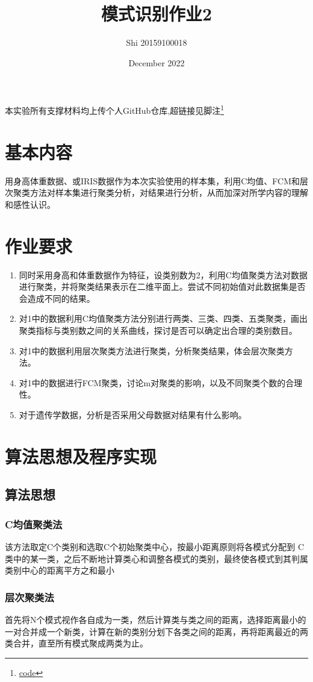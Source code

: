 \documentclass{article}
\title{模式识别作业2}
\author{Shi 20159100018}
\date{December 2022}
\begin{document}
 

\maketitle 
本实验所有支撑材料均上传个人GitHub仓库,超链接见脚注\footnote{\href{https://github.com/Shi5013/HomeWork2022/tree/main/PatternRecognition}{code}}

\section{基本内容}
用身高体重数据、或IRIS数据作为本次实验使用的样本集，利用C均值、FCM和层次聚类方法对样本集进行聚类分析，对结果进行分析，从而加深对所学内容的理解和感性认识。
\section{作业要求}
\begin{enumerate}
    \item 同时采用身高和体重数据作为特征，设类别数为2，利用C均值聚类方法对数据进行聚类，并将聚类结果表示在二维平面上。尝试不同初始值对此数据集是否会造成不同的结果。
    \item 对1中的数据利用C均值聚类方法分别进行两类、三类、四类、五类聚类，画出聚类指标与类别数之间的关系曲线，探讨是否可以确定出合理的类别数目。
    \item 对1中的数据利用层次聚类方法进行聚类，分析聚类结果，体会层次聚类方法。
    \item 对1中的数据进行FCM聚类，讨论m对聚类的影响，以及不同聚类个数的合理性。
    \item 对于遗传学数据，分析是否采用父母数据对结果有什么影响。
\end{enumerate}
\section{算法思想及程序实现}
\subsection{算法思想}
\subsubsection{C均值聚类法}
该方法取定C个类别和选取C个初始聚类中心，按最小距离原则将各模式分配到 C类中的某一类，之后不断地计算类心和调整各模式的类别，最终使各模式到其判属类别中心的距离平方之和最小
\subsubsection{层次聚类法}
首先将N个模式视作各自成为一类，然后计算类与类之间的距离，选择距离最小的一对合并成一个新类，计算在新的类别分划下各类之间的距离，再将距离最近的两类合并，直至所有模式聚成两类为止。
\end{document}
